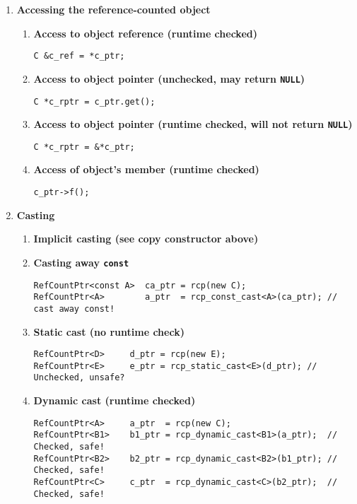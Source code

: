 \documentclass[pdf,ps2pdf,11pt]{SANDreport}
\begin{document}
\begin{enumerate}
\item {\bf Accessing the reference-counted object}
%
\begin{enumerate}
%
\item {\bf Access to object reference (runtime checked)}
%
{\small\begin{verbatim}
C &c_ref = *c_ptr;
\end{verbatim}}
%
\item {\bf Access to object pointer (unchecked, may return \texttt{NULL})}
%
{\small\begin{verbatim}
C *c_rptr = c_ptr.get();
\end{verbatim}}
%
\item {\bf Access to object pointer (runtime checked, will not return \texttt{NULL})}
%
{\small\begin{verbatim}
C *c_rptr = &*c_ptr;
\end{verbatim}}
%
\item {\bf Access of object's member (runtime checked)}
%
{\small\begin{verbatim}
c_ptr->f();
\end{verbatim}}
%
\end{enumerate}

\item {\bf Casting}
\label{rcpqs:apdx:qs:casting}
%
\begin{enumerate}
%
\item {\bf Implicit casting (see copy constructor above)}
%
\item {\bf Casting away \texttt{const}}
%
{\small\begin{verbatim}
RefCountPtr<const A>  ca_ptr = rcp(new C);
RefCountPtr<A>        a_ptr  = rcp_const_cast<A>(ca_ptr); // cast away const!
\end{verbatim}}
%
\item {\bf Static cast (no runtime check)}
%
{\small\begin{verbatim}
RefCountPtr<D>     d_ptr = rcp(new E);
RefCountPtr<E>     e_ptr = rcp_static_cast<E>(d_ptr); // Unchecked, unsafe?
\end{verbatim}}
%
\item {\bf Dynamic cast (runtime checked)}
%
{\small\begin{verbatim}
RefCountPtr<A>     a_ptr  = rcp(new C);
RefCountPtr<B1>    b1_ptr = rcp_dynamic_cast<B1>(a_ptr);  // Checked, safe!
RefCountPtr<B2>    b2_ptr = rcp_dynamic_cast<B2>(b1_ptr); // Checked, safe!
RefCountPtr<C>     c_ptr  = rcp_dynamic_cast<C>(b2_ptr);  // Checked, safe!
\end{verbatim}}
%
\end{enumerate}


\end{enumerate}
\end{document}
